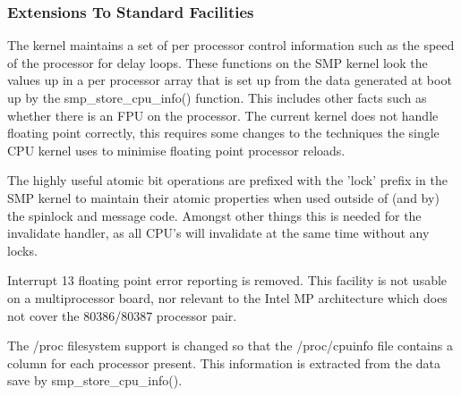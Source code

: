 \documentclass[]{article}
\begin{document}
\subsubsection{Extensions To Standard Facilities}
The kernel maintains a set of per processor control information such as 
the speed of the processor for delay loops. These functions on the SMP 
kernel look the values up in a per processor array that is set up from the 
data generated at boot up by the smp\_store\_cpu\_info() function. This 
includes other facts such as whether there is an FPU on the processor. The 
current kernel does not handle floating point correctly, this requires some 
changes to the techniques the single CPU kernel uses to minimise floating 
point processor reloads.

The highly useful atomic bit operations are prefixed with the 'lock' 
prefix in the SMP kernel to maintain their atomic properties when used 
outside of (and by) the spinlock and message code. Amongst other things 
this is needed for the invalidate handler, as all  CPU's will invalidate at 
the same time without any locks.

Interrupt 13 floating point error reporting is removed. This facility is 
not usable on a multiprocessor board, nor relevant to the Intel MP 
architecture which does not cover the 80386/80387 processor pair. \

The /proc filesystem support is changed so that the /proc/cpuinfo file 
contains a column for each processor present. This information is extracted 
from the data save by smp\_store\_cpu\_info().
\end{document}
